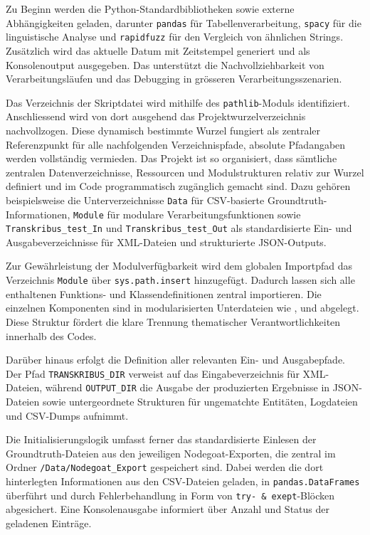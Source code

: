 \documentclass[12pt, a4paper, ngerman, bidi=default]{article}
\newcommand{\code}[1]{\colorbox{VeryLightGray}{\texttt{#1}}} %
\begin{document}
Zu Beginn werden die Python-Standardbibliotheken sowie externe Abhängigkeiten geladen, darunter \code{pandas} für 
Tabellenverarbeitung, \code{spacy} für die linguistische Analyse und \code{rapidfuzz} für den Vergleich von ähnlichen Strings. Zusätzlich 
wird das aktuelle Datum mit Zeitstempel generiert und als Konsolenoutput ausgegeben. Das unterstützt die Nachvollziehbarkeit von
Verarbeitungsläufen und das Debugging in grösseren Verarbeitungsszenarien.

Das Verzeichnis der Skriptdatei wird mithilfe des \code{pathlib}-Moduls identifiziert. Anschliessend wird von dort ausgehend das 
Projektwurzelverzeichnis nachvollzogen. Diese dynamisch bestimmte Wurzel fungiert als zentraler Referenzpunkt für alle nachfolgenden Verzeichnispfade, absolute Pfadangaben werden vollständig vermieden.  
Das Projekt ist so organisiert, dass sämtliche zentralen Datenverzeichnisse, Ressourcen und Modulstrukturen relativ
zur Wurzel definiert und im Code programmatisch zugänglich gemacht sind. Dazu gehören beispielsweise die 
Unterverzeichnisse \code{Data} für CSV-basierte Groundtruth-Informationen, \code{Module} für modulare 
Verarbeitungsfunktionen sowie \code{Transkribus\_test\_In} und \code{Transkribus\_test\_Out} als standardisierte 
Ein- und Ausgabeverzeichnisse für XML-Dateien und strukturierte JSON-Outputs.

Zur Gewährleistung der Modulverfügbarkeit wird dem globalen Importpfad das Verzeichnis \code{Module} über \code{sys.path.insert} hinzugefügt. 
Dadurch lassen sich alle enthaltenen Funktions- und Klassendefinitionen zentral importieren. Die einzelnen Komponenten sind in modularisierten Unterdateien wie ,  und  abgelegt. 
Diese Struktur fördert die klare Trennung thematischer Verantwortlichkeiten innerhalb des Codes.

Darüber hinaus erfolgt die Definition aller relevanten Ein- und Ausgabepfade. Der 
Pfad \code{TRANSKRIBUS\_DIR} verweist auf das Eingabeverzeichnis für XML-Dateien, während 
\code{OUTPUT\_DIR} die Ausgabe der produzierten Ergebnisse in JSON-Dateien 
sowie untergeordnete Strukturen für ungematchte Entitäten, Logdateien und CSV-Dumps aufnimmt.

Die Initialisierungslogik umfasst ferner das standardisierte Einlesen der Groundtruth-Dateien aus den 
jeweiligen Nodegoat-Exporten, die zentral im Ordner \code{/Data/Nodegoat\_Export} gespeichert sind. 
Dabei werden die dort hinterlegten Informationen aus den 
CSV-Dateien geladen, in \code{pandas.DataFrames} überführt und durch Fehlerbehandlung in Form von
\code{try- \& exept}-Blöcken abgesichert. 
Eine Konsolenausgabe informiert über Anzahl und Status der geladenen Einträge.
\end{document}
